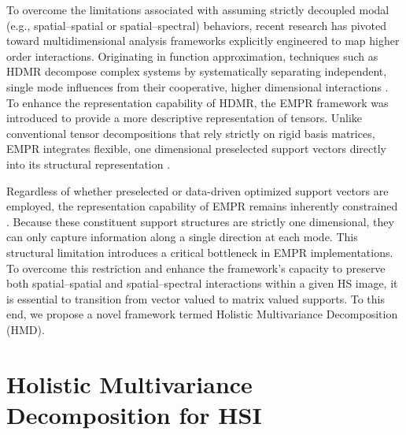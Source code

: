\documentclass[12pt,onecolumn]{article}
\begin{document}
To overcome the limitations associated with assuming strictly decoupled modal (e.g., spatial–spatial or spatial–spectral) behaviors, recent research has pivoted toward multidimensional analysis frameworks explicitly engineered to map higher order interactions. Originating in function approximation, techniques such as HDMR decompose complex systems by systematically separating independent, single mode influences from their cooperative, higher dimensional interactions \cite{tuna_wavelet_hdmr, efe_fusion, tuna_sparse_hdmr}. To enhance the representation capability of HDMR, the EMPR framework was introduced to provide a more descriptive representation of tensors. Unlike conventional tensor decompositions that rely strictly on rigid basis matrices, EMPR integrates flexible, one dimensional preselected support vectors directly into its structural representation \cite{tuna_tgrs, enis}. 

Regardless of whether preselected or data-driven optimized support vectors are employed, the representation capability of EMPR remains inherently constrained \cite{tuna_tgrs, enis}. Because these constituent support structures are strictly one dimensional, they can only capture information along a single direction at each mode. This structural limitation introduces a critical bottleneck in EMPR implementations. To overcome this restriction and enhance the framework's capacity to preserve both spatial–spatial and spatial–spectral interactions within a given HS image, it is essential to transition from vector valued to matrix valued supports. To this end, we propose a novel framework termed Holistic Multivariance Decomposition (HMD).

\section{Holistic Multivariance Decomposition for HSI}
\label{sec:hmd}
\end{document}
